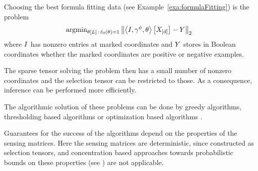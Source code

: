 \begin{example}
	Choosing the best formula fitting data (see Example~\ref{exa:formulaFitting}) is the problem
	\begin{align}
	\mathrm{argmin}_{\theta\left[L\right]\, : \,  \ell_0\left(\theta\right)=1} \left\| \left\langle I,\gamma^{\phi},\theta\right\rangle \left[ X_{[d]} \right] - Y \right\|_2 
	\end{align}
	where $I$ has nonzero entries at marked coordinates and $Y$ stores in Boolean coordinates whether the marked coordinates are positive or negative examples.
\end{example}

The sparse tensor solving the problem then has a small number of nonzero coordinates and the selection tensor can be restricted to those.
As a consequence, inference can be performed more efficiently.

The algorithmic solution of these problems can be done by greedy algorithms, thresholding based algorithms or optimization based algorithms \cite{foucart_mathematical_2013}.

Guarantees for the success of the algorithms depend on the properties of the sensing matrices.
Here the sensing matrices are deterministic, since constructed as selection tensors, and concentration based approaches towards probabilistic bounds on these properties (see \cite{goesmann_uniform_2021}) are not applicable.





